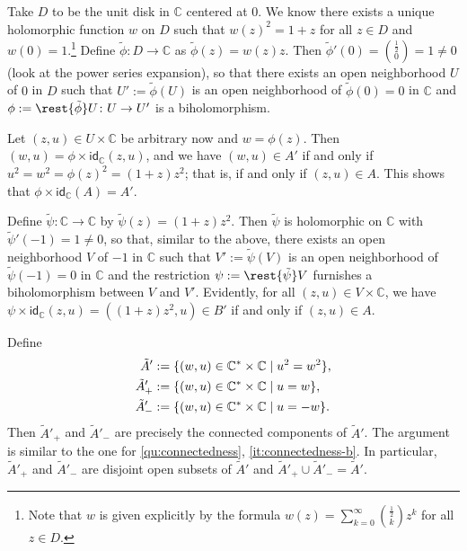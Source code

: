 \documentclass[a4paper]{amsart}
\newcommand{\C}{\mathbb{C}}
\newcommand{\id}[1]{\mathsf{id}_{#1}}
\theoremstyle{remark}
\numberwithin{equation}{question}
\DeclarePairedDelimiter\set{\{}{\}}
\begin{document}
\begin{solution}%
\begin{solenum}
\item Take $D$ to be the unit disk in $\C$ centered at $0$. We know there exists a unique holomorphic function $w$ on $D$ such that $w(z)^2 = 1+z$ for all $z \in D$ and $w(0) = 1$.\footnote{Note that $w$ is given explicitly by the formula $w(z) = \sum_{k=0}^\infty \binom{\frac12}k z^k$ for all $z \in D$.} Define $\tilde\phi \colon D \to \C$ as $\tilde\phi(z) = w(z)z$. Then $\tilde\phi'(0) = \binom{\frac12}0 = 1 \ne 0$ (look at the power series expansion), so that there exists an open neighborhood $U$ of $0$ in $D$ such that $U' := \tilde\phi(U)$ is an open neighborhood of $\tilde\phi(0) = 0$ in $\C$ and $\phi := \rest{\tilde\phi}U \colon U \to U'$ is a biholomorphism.

Let $(z,u) \in U \times \C$ be arbitrary now and $w = \phi(z)$. Then $(w,u) = \phi \times \id\C(z,u)$, and we have $(w,u) \in A'$ if and only if $u^2 = w^2 = \phi(z)^2 = (1+z)z^2$; that is, if and only if $(z,u) \in A$. This shows that $\phi \times \id\C(A) = A'$.

\item Define $\tilde\psi \colon \C \to \C$ by $\tilde\psi(z) = (1+z)z^2$. Then $\tilde\psi$ is holomorphic on $\C$ with $\tilde\psi'(-1) = 1 \ne 0$, so that, similar to the above, there exists an open neighborhood $V$ of $-1$ in $\C$ such that $V' := \tilde\psi(V)$ is an open neighborhood of $\tilde\psi(-1) = 0$ in $\C$ and the restriction $\psi := \rest{\tilde\psi}V$ furnishes a biholomorphism between $V$ and $V'$. Evidently, for all $(z,u) \in V \times \C$, we have $\psi \times \id\C(z,u) = ((1+z)z^2,u) \in B'$ if and only if $(z,u) \in A$.

\item Define
\begin{align*}
\tilde A' &:= \set{(w,u) \in \C^* \times \C \mid u^2 = w^2}, \\
\tilde A'_+ &:= \set{(w,u) \in \C^* \times \C \mid u = w}, \\
\tilde A'_- &:= \set{(w,u) \in \C^* \times \C \mid u = -w}.
\end{align*}
Then $\tilde A'_+$ and $\tilde A'_-$ are precisely the connected components of $\tilde A'$. The argument is similar to the one for \cref{qu:connectedness}, \cref{it:connectedness-b}. In particular, $\tilde A'_+$ and $\tilde A'_-$ are disjoint open subsets of $\tilde A'$ and $\tilde A'_+ \cup \tilde A'_- = \tilde A'$.


\end{solenum}
\end{solution}
\end{document}
